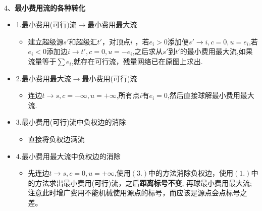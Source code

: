 ~\\
4、\textbf{最小费用流的各种转化}
\begin{itemize}
    \item 1.最小费用(可行)流$\to$最小费用最大流
        \begin{itemize}
            \item 建立超级源$s'$和超级汇$t'$，对顶点$i$ ，若$e_i > 0$添加便$s' \to i, c = 0, u = e_i$,若$e_i < 0$添加边$i \to t', c = 0, u = -e_i$,之后求从$s'$到$t'$的最小费用最大流,如果流量等于$\sum{e_i}$,就存在可行流，残量网络已在原图上求出.
        \end{itemize}
    \item 2.最小费用最大流$\to$最小费用(可行)流
        \begin{itemize}
            \item 连边$t\to s, c = -\infty, u = +\infty$,所有点$i$有$e_i = 0$,然后直接球解最小费用最大流.
        \end{itemize}
    \item 3.最小费用(可行)流中负权边的消除
        \begin{itemize}
            \item 直接将负权边满流
        \end{itemize}
    \item 4.最小费用最大流中负权边的消除
        \begin{itemize}
            \item 先连边$t\to s, c = 0, u = +\infty$,使用$(3.)$中的方法消除负权边，使用$(1.)$中的方法求出最小费用(可行)流，之后\textbf{距离标号不变}, 再球最小费用最大流;注意此时增广费用不能机械使用源点的标号，而应该是源点会点标号之差。
        \end{itemize}
\end{itemize}
~\\
